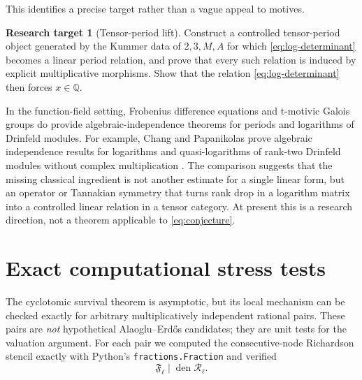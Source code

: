 \documentclass[11pt]{article}
\theoremstyle{definition}
\newtheorem{problem}[theorem]{Research target}
\newcommand{\Q}{\mathbb Q}
\newcommand{\den}{\operatorname{den}}
\begin{document}
This identifies a precise target rather than a vague appeal to motives.

\begin{problem}[Tensor-period lift]
Construct a controlled tensor-period object generated by the Kummer data of
$2,3,M,A$ for which \eqref{eq:log-determinant} becomes a linear period
relation, and prove that every such relation is induced by explicit
multiplicative morphisms.  Show that the relation \eqref{eq:log-determinant}
then forces $x\in\Q$.
\end{problem}

In the function-field setting, Frobenius difference equations and
t-motivic Galois groups do provide algebraic-independence theorems for
periods and logarithms of Drinfeld modules.  For example, Chang and
Papanikolas prove algebraic independence results for logarithms and
quasi-logarithms of rank-two Drinfeld modules without complex multiplication
\cite{ChangPapanikolas2008}.  The comparison suggests that the missing
classical ingredient is not another estimate for a single linear form, but an
operator or Tannakian symmetry that turns rank drop in a logarithm matrix into
a controlled linear relation in a tensor category.  At present this is a
research direction, not a theorem applicable to \eqref{eq:conjecture}.

\section{Exact computational stress tests}
\label{sec:computation}

The cyclotomic survival theorem is asymptotic, but its local mechanism can be
checked exactly for arbitrary multiplicatively independent rational pairs.
These pairs are \emph{not} hypothetical Alaoglu--Erd\H{o}s candidates; they
are unit tests for the valuation argument.  For each pair we computed the
consecutive-node Richardson stencil exactly with Python's
\texttt{fractions.Fraction} and verified
\[
 \mathfrak F_\ell\mid\den\mathcal R_{\ell}.
\]
\end{document}

